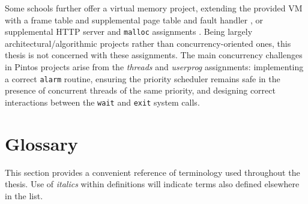 Some schools further offer a virtual memory project, extending the provided VM with a frame table and supplemental page table and fault handler \cite{standford-cs140,uchicago-cs230}, or supplemental HTTP server and {\tt malloc} assignments \cite{berkeley-cs162}.
Being largely architectural/algorithmic projects rather than concurrency-oriented ones, this thesis is not concerned with these assignments.
The main concurrency challenges in Pintos projects arise from the {\em threads} and {\em userprog} assignments:
implementing a correct {\tt alarm} routine,
ensuring the priority scheduler remains safe in the presence of concurrent threads of the same priority,
and designing correct interactions between the {\tt wait} and {\tt exit} system calls.

\section{Glossary}
\label{sec:glossary}

This section provides a convenient reference of terminology used throughout the thesis.
Use of {\em italics} within definitions will indicate terms also defined elsewhere in the list.

